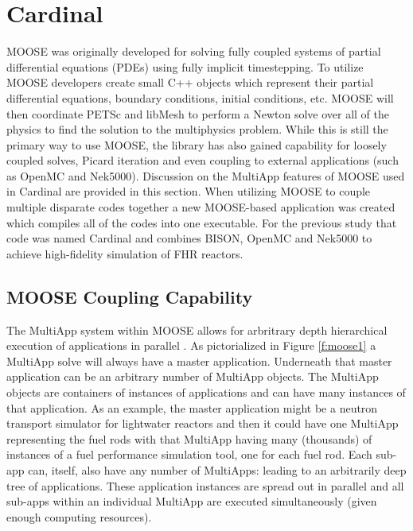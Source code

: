 \section{Cardinal}
\label{s:cardinal}

MOOSE was originally developed for solving fully coupled systems of partial differential equations (PDEs) using fully implicit timestepping. To utilize MOOSE developers create small C++ objects which represent their partial differential equations, boundary conditions, initial conditions, etc. MOOSE will then coordinate PETSc and libMesh to perform a Newton solve over all of the physics to find the solution to the multiphysics problem. While this is still the primary way to use MOOSE, the library has also gained capability for loosely coupled solves, Picard iteration and even coupling to external applications (such as OpenMC and Nek5000). Discussion on the MultiApp features of MOOSE used in Cardinal are provided in this section. When utilizing MOOSE to couple multiple disparate codes together a new MOOSE-based application was created \cite{cardinal}  which compiles all of the codes into one executable. For the previous study that code was  named Cardinal and combines BISON, OpenMC and Nek5000 to achieve high-fidelity simulation of FHR reactors.

\subsection{MOOSE Coupling Capability}

The MultiApp system within MOOSE allows for arbritrary depth hierarchical execution of applications in parallel \cite{gaston2015physics}. As pictorialized in Figure \ref{f:moose1} a MultiApp solve will always have a master application. Underneath that master application can be an arbitrary number of MultiApp objects. The MultiApp objects are containers of instances of applications and can have many instances of that application. As an example, the master application might be a neutron transport simulator for lightwater reactors and then it could have one MultiApp representing the fuel rods with that MultiApp having many (thousands) of instances of a fuel performance simulation tool, one for each fuel rod. Each sub-app can, itself, also have any number of MultiApps: leading to an arbitrarily deep tree of applications. These application instances are spread out in parallel and all sub-apps within an individual MultiApp are executed simultaneously (given enough computing resources).

